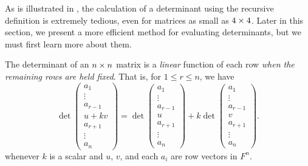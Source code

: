 \begin{remark} \label{remark 4.2.2}
As is illustrated in , the calculation of a determinant using the recursive definition is extremely tedious, even for matrices as small as \(4 \times 4\).
Later in this section, we present a more efficient method for evaluating determinants, but we must first learn more about them.
\end{remark}

\begin{theorem} \label{thm 4.3}
The determinant of an \(n \times n\) matrix is a \emph{linear} function of each row \emph{when the remaining rows are held fixed}.
That is, for \(1 \le r \le n\), we have
\[
    \det \begin{pmatrix} a_1 \\ \vdots \\ a_{r-1} \\ u + kv \\ a_{r+1} \\ \vdots \\ a_n \end{pmatrix}
    = \det \begin{pmatrix} a_1 \\ \vdots \\ a_{r-1} \\ u \\ a_{r+1} \\ \vdots \\ a_n \end{pmatrix}
    + k \det \begin{pmatrix} a_1 \\ \vdots \\ a_{r-1} \\ v \\ a_{r+1} \\ \vdots \\ a_n \end{pmatrix}.
\]
whenever \(k\) is a scalar and \(u\), \(v\), and each \(a_i\) are row vectors in \(F^n\).
\end{theorem}

